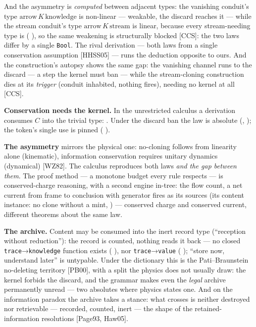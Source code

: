 \documentclass[11pt]{article}
\begin{document}
And the asymmetry is \emph{computed} between adjacent types: the vanishing
conduit's type $\mathrm{arrow}\,K\,\mathrm{knowledge}$ is non-linear ---
weakable, the discard reaches it --- while the stream conduit's type
$\mathrm{arrow}\,K\,\mathrm{stream}$ is linear, because every stream-needing
type is ( \meas{}), so the same weakening is structurally
blocked [CCS]: the two laws differ by a single \texttt{Bool}. The rival
derivation --- both laws from a single conservation assumption [HHSS05] ---
runs the deduction opposite to ours. And the
construction's autopsy shows the same gap: the vanishing channel runs to the
discard --- a step the kernel must ban --- while the stream-cloning
construction dies at its \emph{trigger} (conduit inhabited, nothing fires),
needing no kernel at all [CCS].

\textbf{Conservation needs the kernel.} In the unrestricted calculus a
derivation consumes $C$ into the trivial type:
 \meas{}. Under the discard ban the
law is absolute (,
 \meas{}); the token's single use is pinned
( \meas{}).

\textbf{The asymmetry} mirrors the physical one: no-cloning follows from
linearity alone (kinematic), information conservation requires unitary
dynamics (dynamical) [WZ82]. The calculus reproduces both laws \emph{and the
gap between them}. The proof method --- a monotone budget every rule
respects --- is conserved-charge reasoning, with a second engine in-tree: the
flow count, a net current from frame to conclusion with generator fires as
its sources (its content instance: no clone without a mint,
 \meas{}) --- conserved charge and conserved
current, different theorems about the same law. \interp{}

\textbf{The archive.} Content may be consumed into the inert record type
(``reception without reduction''): the record is counted, nothing reads it
back --- no closed \texttt{trace}→\texttt{knowledge} function exists
( \meas{}), nor \texttt{trace}→\texttt{value}
( \meas{}); ``store now, understand later'' is
untypable. Under the dictionary this is the Pati--Braunstein no-deleting
territory [PB00], with a split the physics does not usually draw: the
kernel forbids the discard, and the grammar makes even the \emph{legal}
archive permanently unread --- two absolutes where physics states one.
\interp{} And on the information paradox the archive takes a stance:
what crosses is neither destroyed nor retrievable --- recorded, counted,
inert --- the shape of the retained-information resolutions [Page93,
Haw05]. \interp{}
\end{document}
